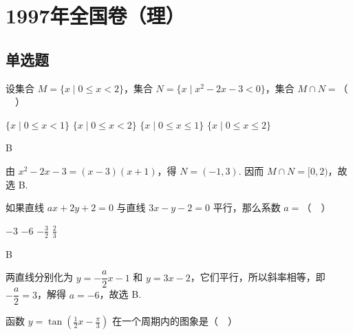 \chapter{1997年全国卷（理）}
\section{单选题}

\begin{problem}
设集合 \(M = \{x \mid 0 \leqslant x < 2\}\)，集合 \(N = \{x \mid x^2 - 2x - 3 < 0\}\)，集合 \(M \cap N =\)（\(\quad\)）

\choices
    {\(\{x \mid 0\leqslant x < 1\}\)}
    {\(\{x \mid 0\leqslant x < 2\}\)}
    {\(\{x \mid 0\leqslant x\leqslant 1\}\)}
    {\(\{x \mid 0\leqslant x\leqslant 2\}\)}
\end{problem}

\begin{answer}
B
\end{answer}

\begin{solution}
由 \(x^{2}-2x-3=(x-3)(x+1)\)，得 \(N=(-1,3)\). 因而 \(M\cap N=[0,2)\)，故选 B.
\end{solution}

\begin{problem}
如果直线 \(ax + 2y + 2 = 0\) 与直线 \(3x - y - 2 = 0\) 平行，那么系数 \(a =\)（\(\quad\)）

\choices
    {\(-3\)}
    {\(-6\)}
    {\(-\frac{3}{2}\)}
    {\(\frac{2}{3}\)}
\end{problem}

\begin{answer}
B
\end{answer}

\begin{solution}
两直线分别化为 \(y=-\dfrac{a}{2}x-1\) 和 \(y=3x-2\)，它们平行，所以斜率相等，即 \(-\dfrac{a}{2}=3\)，解得 \(a=-6\)，故选 B.
\end{solution}

\begin{problem}
函数 \(y = \tan \left(\frac{1}{2}x - \frac{\pi}{3}\right)\) 在一个周期内的图象是（\(\quad\)）

    {}
    {}
    {}
\end{problem}


